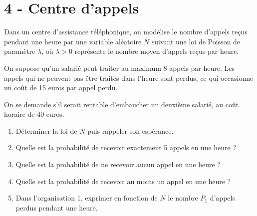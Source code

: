 \section*{4 - Centre d'appels}
Dans un centre d'assistance téléphonique, on modélise le nombre d'appels reçus pendant une heure par une variable aléatoire $N$ suivant une loi de Poisson de paramètre $\lambda$, où $\lambda > 0$ représente le nombre moyen d'appels reçus par heure.

On suppose qu'un salarié peut traiter au maximum 8 appels par heure. Les appels qui ne peuvent pas être traités dans l'heure sont perdus, ce qui occasionne un coût de 15 euros par appel perdu.

On se demande s'il serait rentable d'embaucher un deuxième salarié, au coût horaire de 40 euros.

\begin{enumerate}
    \item Déterminer la loi de $N$ puis rappeler son espérance.
    \item Quelle est la probabilité de recevoir exactement 5 appels en une heure ?
    \item Quelle est la probabilité de ne recevoir aucun appel en une heure ?
    \item Quelle est la probabilité de recevoir au moins un appel en une heure ?
    \item Dans l'organisation 1, exprimer en fonction de $N$ le nombre $P_1$ d'appels perdus pendant une heure.

\end{enumerate}
